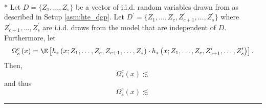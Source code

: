 \newpage
\begin{lem}\label{lem:CATE_omega_sc}\mbox{}\\*
	Let $D = \{Z_1, \dotsc, Z_{s}\}$ be a vector of i.i.d. random variables drawn from as described in Setup \ref{asm:hte_dgp}.
	Let $D^{\prime} = \{Z_1, \dotsc, Z_{c}, Z_{c+1}^{\prime}, \dotsc,  Z_{s}^{\prime}\}$ where $Z_{c+1}^{\prime}, \dotsc,  Z_{s}^{\prime}$ are i.i.d. draws from the model that are independent of $D$.
	Furthermore, let
	\begin{equation}
		\Omega_{s}^{c}\left(x\right)
		= \E\left[h_{s}\left(x; Z_1, \ldots, Z_{c}, Z_{c+1}, \ldots, Z_{s}\right) \cdot
			h_{s}\left(x; Z_1, \ldots,Z_{c}, Z_{c+1}^{\prime}, \ldots, Z_{s}^{\prime}\right)\right].
	\end{equation}
	Then,
	\begin{equation}
		\Omega_{s}^{c}\left(x\right)
		\lesssim 
	\end{equation}
	and thus
	\begin{equation}
		\Omega_{s}^{c}\left(x\right)
		\lesssim 
	\end{equation}
\end{lem}
\hrule
